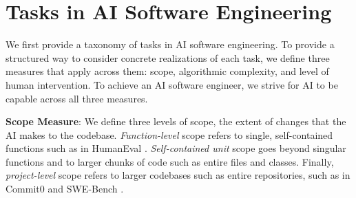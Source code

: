 \vspace{-0.2cm}

\section{Tasks in AI Software Engineering} 

\vspace{-0.2cm}

\label{sec:tasks-milestones}
We first provide a taxonomy of tasks in AI software engineering. To provide a structured way to consider concrete realizations of each task, we define three measures that apply across them: scope, algorithmic complexity, and level of human intervention. To achieve an AI software engineer, we strive for AI to be capable across all three measures.

\textbf{Scope Measure}: We define three levels of scope, the extent of changes that the AI makes to the codebase. \textit{Function-level} scope refers to single, self-contained functions such as in HumanEval \citep{chen2021evaluating}. \textit{Self-contained unit} scope goes beyond singular functions and to larger chunks of code such as entire files and classes. Finally, \textit{project-level} scope refers to larger codebases such as entire repositories, such as in Commit0 \citep{zhao2024commit0} and SWE-Bench \citep{jimenez2024swebench}.



